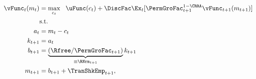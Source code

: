   \begin{equation}\begin{gathered}\begin{aligned}
        \null{\vFunc}_{t}({m}_{t}) & = \max_{{c}_{t}} ~~ \uFunc({c}_{t})+
        {\DiscFac}\Ex_{t}[ \PermGroFac_{t+1}^{1-\CRRA}\null{\vFunc}_{t+1}({m}_{t+1})] \label{eq:vNormed} \\
                                   & \text{s.t.}   \\
      {a}_{t}                      & = {m}_{t}-{c}_{t} \\
      {k}_{t+1}                    & = {a}_{t} \\
      {b}_{t+1}                    & = \underbrace{\left(\Rfree/\PermGroFac_{t+1}\right)}_{\equiv \RNrm_{t+1}}{k}_{t+1} \\
      {m}_{t+1}                    & = {b}_{t+1}+\TranShkEmp_{t+1},
      \end{aligned}\end{gathered}\end{equation}
